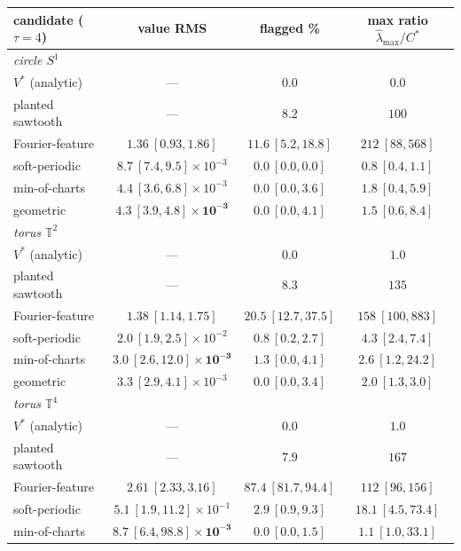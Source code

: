 \begin{table}[!tbp]
\centering\footnotesize\setlength{\tabcolsep}{4pt}
\begin{tabular}{lccc}
\toprule
candidate ($\tau = 4$) & value RMS & flagged \% & max ratio $\hat\lambda_{\max}/C^{*}$ \\
\midrule
\multicolumn{4}{l}{\emph{circle $S^{1}$}} \\
$V^{*}$ (analytic) & --- & $0.0$ & $0.0$ \\
planted sawtooth & --- & $8.2$ & $100$ \\
Fourier-feature & $1.36\ [0.93,1.86]$ & $11.6\ [5.2,18.8]$ & $212\ [88,568]$ \\
soft-periodic & $8.7\ [7.4,9.5]\times10^{-3}$ & $\bm{0.0\ [0.0,0.0]}$ & $\bm{0.8\ [0.4,1.1]}$ \\
min-of-charts & $4.4\ [3.6,6.8]\times10^{-3}$ & $\bm{0.0\ [0.0,3.6]}$ & $1.8\ [0.4,5.9]$ \\
geometric & $\bm{4.3\ [3.9,4.8]\times10^{-3}}$ & $\bm{0.0\ [0.0,4.1]}$ & $1.5\ [0.6,8.4]$ \\
\midrule
\multicolumn{4}{l}{\emph{torus $\mathbb{T}^{2}$}} \\
$V^{*}$ (analytic) & --- & $0.0$ & $1.0$ \\
planted sawtooth & --- & $8.3$ & $135$ \\
Fourier-feature & $1.38\ [1.14,1.75]$ & $20.5\ [12.7,37.5]$ & $158\ [100,883]$ \\
soft-periodic & $2.0\ [1.9,2.5]\times10^{-2}$ & $0.8\ [0.2,2.7]$ & $4.3\ [2.4,7.4]$ \\
min-of-charts & $\bm{3.0\ [2.6,12.0]\times10^{-3}}$ & $1.3\ [0.0,4.1]$ & $2.6\ [1.2,24.2]$ \\
geometric & $3.3\ [2.9,4.1]\times10^{-3}$ & $\bm{0.0\ [0.0,3.4]}$ & $\bm{2.0\ [1.3,3.0]}$ \\
\midrule
\multicolumn{4}{l}{\emph{torus $\mathbb{T}^{4}$}} \\
$V^{*}$ (analytic) & --- & $0.0$ & $1.0$ \\
planted sawtooth & --- & $7.9$ & $167$ \\
Fourier-feature & $2.61\ [2.33,3.16]$ & $87.4\ [81.7,94.4]$ & $112\ [96,156]$ \\
soft-periodic & $5.1\ [1.9,11.2]\times10^{-1}$ & $2.9\ [0.9,9.3]$ & $18.1\ [4.5,73.4]$ \\
min-of-charts & $\bm{8.7\ [6.4,98.8]\times10^{-3}}$ & $\bm{0.0\ [0.0,1.5]}$ & $\bm{1.1\ [1.0,33.1]}$ \\

\end{tabular}
\end{table}
